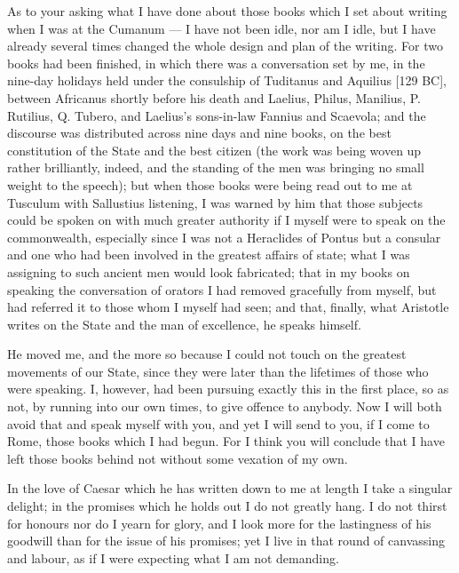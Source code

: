 

 As to your asking what I have done about those books which I set about writing when I was at the Cumanum --- I have not been idle, nor am I idle, but I have already several times changed the whole design and plan of the writing. For two books had been finished, in which there was a conversation set by me, in the nine-day holidays held under the consulship of Tuditanus and Aquilius [129 BC], between Africanus shortly before his death and Laelius, Philus, Manilius, P. Rutilius, Q. Tubero, and Laelius's sons-in-law Fannius and Scaevola; and the discourse was distributed across nine days and nine books, on the best constitution of the State and the best citizen (the work was being woven up rather brilliantly, indeed, and the standing of the men was bringing no small weight to the speech); but when those books were being read out to me at Tusculum with Sallustius listening, I was warned by him that those subjects could be spoken on with much greater authority if I myself were to speak on the commonwealth, especially since I was not a Heraclides of Pontus but a consular and one who had been involved in the greatest affairs of state; what I was assigning to such ancient men would look fabricated; that in my books on speaking the conversation of orators I had removed gracefully from myself, but had referred it to those whom I myself had seen; and that, finally, what Aristotle writes on the State and the man of excellence, he speaks himself.

 He moved me, and the more so because I could not touch on the greatest movements of our State, since they were later than the lifetimes of those who were speaking. I, however, had been pursuing exactly this in the first place, so as not, by running into our own times, to give offence to anybody. Now I will both avoid that and speak myself with you, and yet I will send to you, if I come to Rome, those books which I had begun. For I think you will conclude that I have left those books behind not without some vexation of my own.

 In the love of Caesar which he has written down to me at length I take a singular delight; in the promises which he holds out I do not greatly hang. I do not thirst for honours nor do I yearn for glory, and I look more for the lastingness of his goodwill than for the issue of his promises; yet I live in that round of canvassing and labour, as if I were expecting what I am not demanding.

